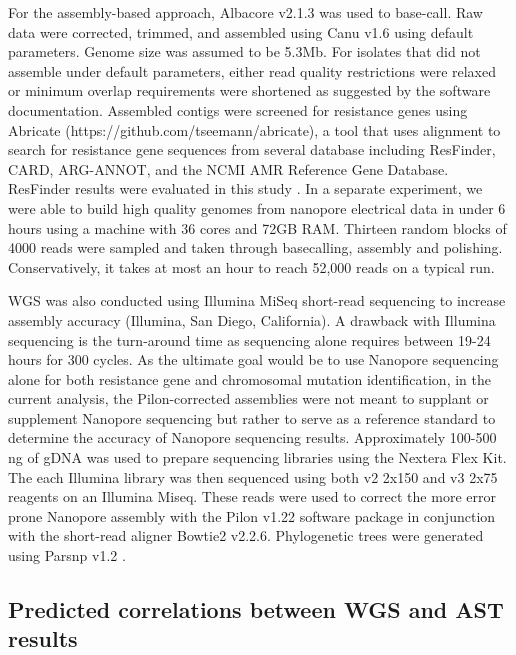 For the assembly-based approach, Albacore v2.1.3 was used to base-call. Raw data were corrected, trimmed, and assembled using Canu v1.6 \citep{Koren2017-wf} using default parameters. Genome size was assumed to be 5.3Mb. For isolates that did not assemble under default parameters, either read quality restrictions were relaxed or minimum overlap requirements were shortened as suggested by the software documentation. Assembled contigs were screened for resistance genes using Abricate (https://github.com/tseemann/abricate), a tool that uses alignment to search for resistance gene sequences from several database including ResFinder, CARD, ARG-ANNOT, and the NCMI AMR Reference Gene Database. ResFinder results were evaluated in this study \citep{Zankari2012-uk}. In a separate experiment, we were able to build high quality genomes from nanopore electrical data in under 6 hours using a machine with 36 cores and 72GB RAM. Thirteen random blocks of 4000 reads were sampled and taken through basecalling, assembly and polishing. Conservatively, it takes at most an hour to reach 52,000 reads on a typical run.

WGS was also conducted using Illumina MiSeq short-read sequencing to increase assembly accuracy (Illumina, San Diego, California). A drawback with Illumina sequencing is the turn-around time as sequencing alone requires between 19-24 hours for 300 cycles. As the ultimate goal would be to use Nanopore sequencing alone for both resistance gene and chromosomal mutation identification, in the current analysis, the Pilon-corrected assemblies were not meant to supplant or supplement Nanopore sequencing but rather to serve as a reference standard to determine the accuracy of Nanopore sequencing results. Approximately 100-500 ng of gDNA was used to prepare sequencing libraries using the Nextera Flex Kit. The each Illumina library was then sequenced using both v2 2x150 and v3 2x75 reagents on an Illumina Miseq. These reads were used to correct the more error prone Nanopore assembly with the Pilon v1.22 software package in conjunction with the short-read aligner Bowtie2 v2.2.6. Phylogenetic trees were generated using Parsnp v1.2 \citep{Treangen2014-bu}.

\subsection{Predicted correlations between WGS and AST results}
\label{sec:wgsast}

